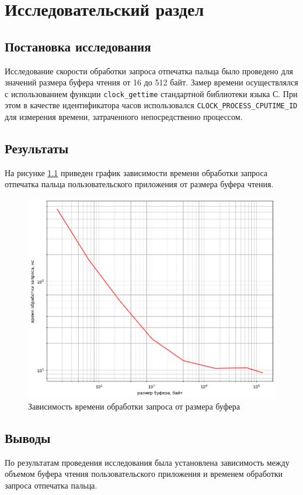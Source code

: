 \chapter{Исследовательский раздел}

\section{Постановка исследования}

Исследование скорости обработки запроса отпечатка пальца было проведено для значений размера буфера чтения от 16 до 512 байт. Замер времени осуществлялся с использованием функции \texttt{clock\_gettime} стандартной библиотеки языка С. При этом в качестве идентификатора часов использовался \texttt{CLOCK\_PROCESS\_CPUTIME\_ID} для измерения времени, затраченного непосредственно процессом.

\section{Результаты}

На рисунке \ref{fig:research} приведен график зависимости времени обработки запроса отпечатка пальца пользовательского приложения от размера буфера чтения.

\begin{figure}[h!]
    \centering
    \includegraphics[width=\textwidth]{img/research.png}
    \caption{Зависимость времени обработки запроса от размера буфера}
    \label{fig:research}
\end{figure}

\section*{Выводы}

По результатам проведения исследования была установлена зависимость между объемом буфера чтения пользовательского приложения и временем обработки запроса отпечатка пальца.
